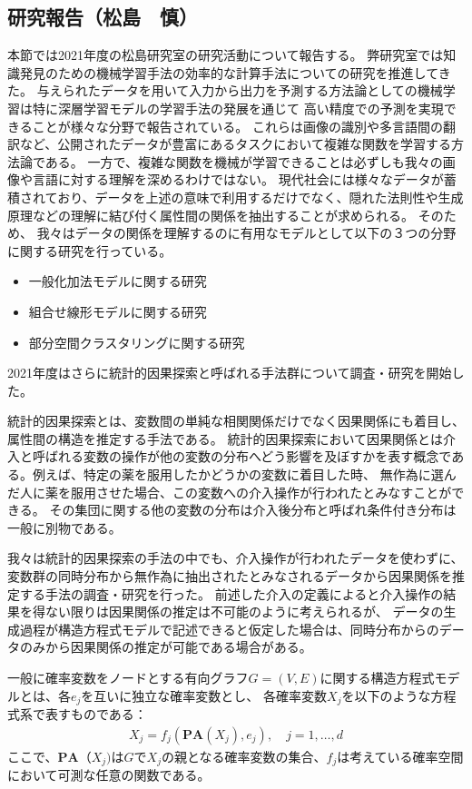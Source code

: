 \subsection{研究報告（松島　慎）}

本節では2021年度の松島研究室の研究活動について報告する。
弊研究室では知識発見のための機械学習手法の効率的な計算手法についての研究を推進してきた。
与えられたデータを用いて入力から出力を予測する方法論としての機械学習は特に深層学習モデルの学習手法の発展を通じて
高い精度での予測を実現できることが様々な分野で報告されている。
これらは画像の識別や多言語間の翻訳など、公開されたデータが豊富にあるタスクにおいて複雑な関数を学習する方法論である。
一方で、複雑な関数を機械が学習できることは必ずしも我々の画像や言語に対する理解を深めるわけではない。
現代社会には様々なデータが蓄積されており、データを上述の意味で利用するだけでなく、隠れた法則性や生成原理などの理解に結び付く属性間の関係を抽出することが求められる。
そのため、
我々はデータの関係を理解するのに有用なモデルとして以下の３つの分野に関する研究を行っている。
\begin{itemize}
    \item 一般化加法モデルに関する研究
    \item 組合せ線形モデルに関する研究
    \item 部分空間クラスタリングに関する研究
\end{itemize}
2021年度はさらに統計的因果探索と呼ばれる手法群について調査・研究を開始した。

統計的因果探索とは、変数間の単純な相関関係だけでなく因果関係にも着目し、属性間の構造を推定する手法である。
統計的因果探索において因果関係とは介入と呼ばれる変数の操作が他の変数の分布へどう影響を及ぼすかを表す概念である。例えば、特定の薬を服用したかどうかの変数に着目した時、
無作為に選んだ人に薬を服用させた場合、この変数への介入操作が行われたとみなすことができる。
その集団に関する他の変数の分布は介入後分布と呼ばれ条件付き分布は一般に別物である。

我々は統計的因果探索の手法の中でも、介入操作が行われたデータを使わずに、変数群の同時分布から無作為に抽出されたとみなされるデータから因果関係を推定する手法の調査・研究を行った。
前述した介入の定義によると介入操作の結果を得ない限りは因果関係の推定は不可能のように考えられるが、
データの生成過程が構造方程式モデルで記述できると仮定した場合は、同時分布からのデータのみから因果関係の推定が可能である場合がある。

一般に確率変数をノードとする有向グラフ$G=(V,E)$に関する構造方程式モデルとは、各$e_j$を互いに独立な確率変数とし、
各確率変数$X_{j}$を以下のような方程式系で表すものである：
\begin{align*}
    X_{j}=f_{j}\left(\mathbf{PA}(X_{j}), e_{j}\right), \quad j=1, \ldots, d
\end{align*}
ここで、$\mathbf{PA}（X_j)$は$G$で$X_j$の親となる確率変数の集合、$f_j$は考えている確率空間において可測な任意の関数である。

